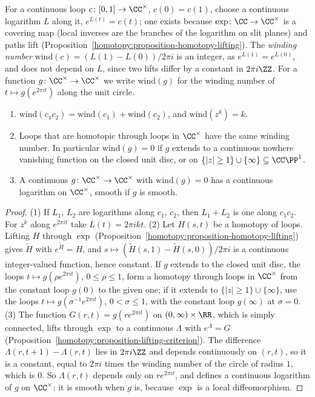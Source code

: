 For a continuous loop $c \colon [0, 1] \to \CC^\times$, $c(0) = c(1)$, choose a continuous logarithm $L$ along it, $e^{L(t)} = c(t)$; one exists because $\exp \colon \CC \to \CC^\times$ is a covering
map (local inverses are the branches of the logarithm on slit planes) and paths lift (Proposition~\ref{homotopy:proposition-homotopy-lifting}). The \emph{winding number}
$\mathrm{wind}(c) = (L(1) - L(0))/2\pi i$ is an integer, as $e^{L(1)} = e^{L(0)}$, and does not depend on $L$, since two lifts differ by a constant in $2\pi i\ZZ$. For a function
$g \colon \CC^\times \to \CC^\times$ we write $\mathrm{wind}(g)$ for the winding number of $t \mapsto g(e^{2\pi it})$ along the unit circle.

\begin{lemma}\label{vector-bundles:lemma-winding-number}
\begin{enumerate}
\item $\mathrm{wind}(c_1c_2) = \mathrm{wind}(c_1) + \mathrm{wind}(c_2)$, and $\mathrm{wind}(z^k) = k$.
\item Loops that are homotopic through loops in $\CC^\times$ have the same winding number. In particular $\mathrm{wind}(g) = 0$ if $g$ extends to a continuous nowhere vanishing
function on the closed unit disc, or on $\{|z| \geq 1\} \cup \{\infty\} \subseteq \CC\PP^1$.
\item A continuous $g \colon \CC^\times \to \CC^\times$ with $\mathrm{wind}(g) = 0$ has a continuous logarithm on $\CC^\times$, smooth if $g$ is smooth.
\end{enumerate}
\end{lemma}

\begin{proof}
(1) If $L_1$, $L_2$ are logarithms along $c_1$, $c_2$, then $L_1 + L_2$ is one along $c_1c_2$. For $z^k$ along $e^{2\pi it}$ take $L(t) = 2\pi ikt$. (2) Let $H(s, t)$ be a homotopy of loops.
Lifting $H$ through $\exp$ (Proposition~\ref{homotopy:proposition-homotopy-lifting}) gives $\tilde H$ with $e^{\tilde H} = H$, and $s \mapsto (\tilde H(s, 1) - \tilde H(s, 0))/2\pi i$ is a
continuous integer-valued function, hence constant. If $g$ extends to the closed unit disc, the loops $t \mapsto g(\rho e^{2\pi it})$, $0 \leq \rho \leq 1$, form a homotopy through loops in
$\CC^\times$ from the constant loop $g(0)$ to the given one; if it extends to $\{|z| \geq 1\} \cup \{\infty\}$, use the loops $t \mapsto g(\sigma^{-1}e^{2\pi it})$, $0 < \sigma \leq 1$, with the
constant loop $g(\infty)$ at $\sigma = 0$.
(3) The function $G(r, t) = g(re^{2\pi it})$ on $(0, \infty) \times \RR$, which is simply connected, lifts through $\exp$ to a continuous $\Lambda$ with $e^\Lambda = G$
(Proposition~\ref{homotopy:proposition-lifting-criterion}). The difference $\Lambda(r, t + 1) - \Lambda(r, t)$ lies in $2\pi i\ZZ$ and depends continuously on $(r, t)$, so it is a constant, equal to
$2\pi i$ times the winding number of the circle of radius $1$, which is $0$. So $\Lambda(r, t)$ depends only on $re^{2\pi it}$, and defines a continuous logarithm of $g$ on $\CC^\times$; it is
smooth when $g$ is, because $\exp$ is a local diffeomorphism.
\end{proof}

